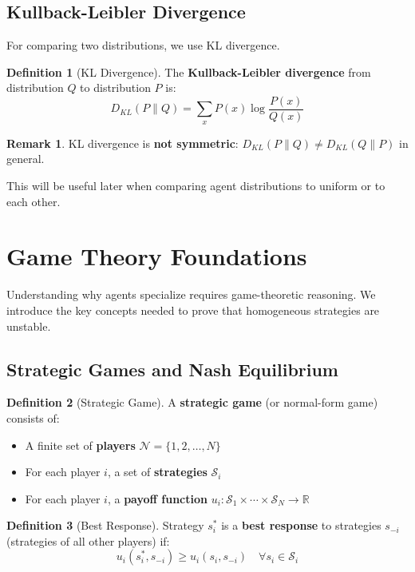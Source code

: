 \documentclass[11pt,a4paper]{article}
\theoremstyle{definition}
\newtheorem{definition}{Definition}[section]
\newtheorem{remark}{Remark}[section]
\theoremstyle{plain}
\newcommand{\R}{\mathbb{R}}
\begin{document}
\subsection{Kullback-Leibler Divergence}

For comparing two distributions, we use KL divergence.

\begin{definition}[KL Divergence]
The \textbf{Kullback-Leibler divergence} from distribution $Q$ to distribution $P$ is:
\begin{equation}
D_{KL}(P \| Q) = \sum_x P(x) \log \frac{P(x)}{Q(x)}
\end{equation}
\end{definition}

\begin{remark}
KL divergence is \textbf{not symmetric}: $D_{KL}(P \| Q) \neq D_{KL}(Q \| P)$ in general.
\end{remark}

This will be useful later when comparing agent distributions to uniform or to each other.

\newpage
\section{Game Theory Foundations}

Understanding why agents specialize requires game-theoretic reasoning. We introduce the key concepts needed to prove that homogeneous strategies are unstable.

\subsection{Strategic Games and Nash Equilibrium}

\begin{definition}[Strategic Game]
A \textbf{strategic game} (or normal-form game) consists of:
\begin{itemize}
    \item A finite set of \textbf{players} $\mathcal{N} = \{1, 2, \ldots, N\}$
    \item For each player $i$, a set of \textbf{strategies} $\mathcal{S}_i$
    \item For each player $i$, a \textbf{payoff function} $u_i: \mathcal{S}_1 \times \cdots \times \mathcal{S}_N \to \R$
\end{itemize}
\end{definition}

\begin{definition}[Best Response]
Strategy $s_i^*$ is a \textbf{best response} to strategies $s_{-i}$ (strategies of all other players) if:
\begin{equation}
u_i(s_i^*, s_{-i}) \geq u_i(s_i, s_{-i}) \quad \forall s_i \in \mathcal{S}_i
\end{equation}
\end{definition}
\end{document}
